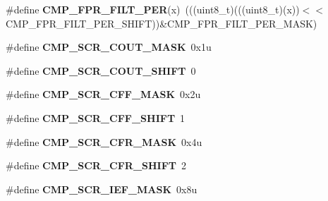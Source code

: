 \begin{DoxyCompactItemize}
\item 
\mbox{\label{group___c_m_p___register___masks_ga006ee9cac0b4b9daa94e3b1d6a440627}} 
\#define {\bfseries C\+M\+P\+\_\+\+F\+P\+R\+\_\+\+F\+I\+L\+T\+\_\+\+P\+ER}(x)~(((uint8\+\_\+t)(((uint8\+\_\+t)(x))$<$$<$C\+M\+P\+\_\+\+F\+P\+R\+\_\+\+F\+I\+L\+T\+\_\+\+P\+E\+R\+\_\+\+S\+H\+I\+FT))\&C\+M\+P\+\_\+\+F\+P\+R\+\_\+\+F\+I\+L\+T\+\_\+\+P\+E\+R\+\_\+\+M\+A\+SK)
\item 
\mbox{\label{group___c_m_p___register___masks_ga024aec72a28ecdc04a1441cd7a3af23a}} 
\#define {\bfseries C\+M\+P\+\_\+\+S\+C\+R\+\_\+\+C\+O\+U\+T\+\_\+\+M\+A\+SK}~0x1u
\item 
\mbox{\label{group___c_m_p___register___masks_gaa508076192a6b9aed5c4d46282c64394}} 
\#define {\bfseries C\+M\+P\+\_\+\+S\+C\+R\+\_\+\+C\+O\+U\+T\+\_\+\+S\+H\+I\+FT}~0
\item 
\mbox{\label{group___c_m_p___register___masks_gaab44e3da0576b12dd809881323944a1c}} 
\#define {\bfseries C\+M\+P\+\_\+\+S\+C\+R\+\_\+\+C\+F\+F\+\_\+\+M\+A\+SK}~0x2u
\item 
\mbox{\label{group___c_m_p___register___masks_ga076d455f0d5bdad02282cbcce6e04c01}} 
\#define {\bfseries C\+M\+P\+\_\+\+S\+C\+R\+\_\+\+C\+F\+F\+\_\+\+S\+H\+I\+FT}~1
\item 
\mbox{\label{group___c_m_p___register___masks_ga876bfa2799338c6b10b152940d25c4a7}} 
\#define {\bfseries C\+M\+P\+\_\+\+S\+C\+R\+\_\+\+C\+F\+R\+\_\+\+M\+A\+SK}~0x4u
\item 
\mbox{\label{group___c_m_p___register___masks_ga78595d16db987c96e73ce96fc5436f6b}} 
\#define {\bfseries C\+M\+P\+\_\+\+S\+C\+R\+\_\+\+C\+F\+R\+\_\+\+S\+H\+I\+FT}~2
\item 
\mbox{\label{group___c_m_p___register___masks_gab36859944bb484db243358bb9a1a9692}} 
\#define {\bfseries C\+M\+P\+\_\+\+S\+C\+R\+\_\+\+I\+E\+F\+\_\+\+M\+A\+SK}~0x8u
\item 
\mbox{\label{group___c_m_p___register___masks_gaa9d242eac081d0d572e120ea3afa0e6f}} 
$$
\end{DoxyCompactItemize}
